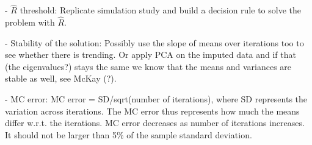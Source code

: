 \documentclass[article]{jss}
\begin{document}
- $\hat{R}$ threshold: Replicate simulation study and build a decision rule to solve the problem with $\hat{R}$.

- Stability of the solution: Possibly use the slope of means over iterations too to see whether there is trending. Or apply PCA on the imputed data and if that (the eigenvalues?) stays the same we know that the means and variances are stable as well, see McKay (?). 

- MC error: MC error = SD/sqrt(number of iterations), where SD represents the variation across iterations. The MC error thus represents how much the means differ w.r.t. the iterations. MC error decreases as number of iterations increases. It should not be larger than 5\% of the sample standard deviation.





\end{document}
